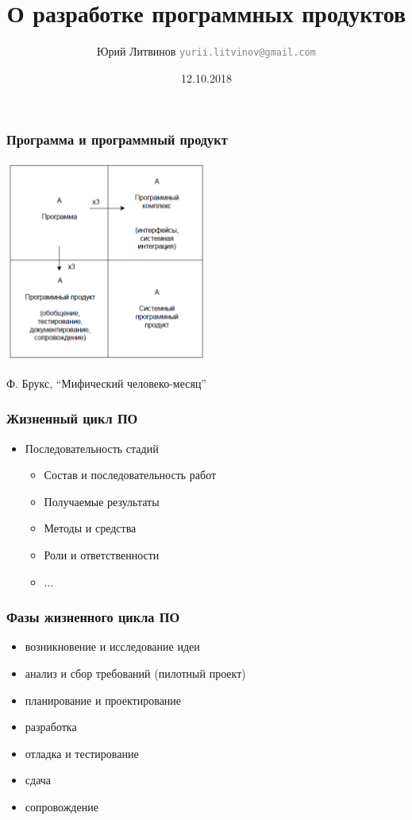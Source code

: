 \documentclass[xetex,mathserif,serif]{beamer}
\title{О разработке программных продуктов}
\author[Юрий Литвинов]{Юрий Литвинов \newline \textcolor{gray}{\small\texttt{yurii.litvinov@gmail.com}}}
\date{12.10.2018}
\begin{document}
	
	\frame{\titlepage}
	
	\begin{frame}
		\frametitle{Программа и программный продукт}
		\begin{center}
			\includegraphics[width=0.5\textwidth]{mythical-man-month.png}
		\end{center}
		\begin{center}
			Ф. Брукс, ``Мифический человеко-месяц''
		\end{center}
	\end{frame}

	\begin{frame}
		\frametitle{Жизненный цикл ПО}
		\begin{itemize}
			\item Последовательность стадий
			\begin{itemize}
				\item Состав и последовательность работ
				\item Получаемые результаты
				\item Методы и средства
				\item Роли и ответственности
				\item ...
			\end{itemize}
		\end{itemize}
	\end{frame}

	\begin{frame}
		\frametitle{Фазы жизненного цикла ПО}
		\begin{itemize}
			\item возникновение и исследование идеи
			\item анализ и сбор требований (пилотный проект)
			\item планирование и проектирование
			\item разработка
			\item отладка и тестирование
			\item сдача
			\item сопровождение
		\end{itemize}
	\end{frame}
\end{document}
